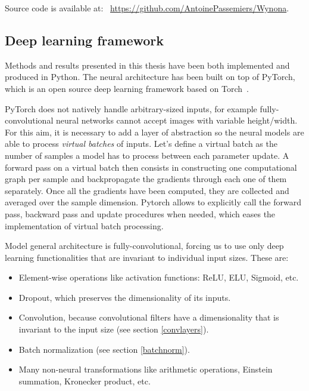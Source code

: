     Source code is available at: \,
    \href{https://github.com/AntoinePassemiers/Wynona}{https://github.com/AntoinePassemiers/Wynona}.

  \subsection{Deep learning framework}

    Methods and results presented in this thesis have been both implemented and produced in
    Python. The neural architecture has been built on top of PyTorch,
    which is an open source deep learning framework based on Torch~\cite{torch}.

    PyTorch does not natively handle arbitrary-sized inputs, for example fully-convolutional
    neural networks cannot accept images with variable height/width.
    For this aim, it is necessary to add a layer of abstraction so the neural models are
    able to process \textit{virtual batches} of inputs. Let's define a virtual batch as the number
    of samples a model has to process between each parameter update.
    A forward pass on a virtual batch then consists in constructing one computational graph
    per sample and backpropagate the gradients through each one of them separately.
    Once all the gradients have been computed, they are collected and averaged over the sample
    dimension. Pytorch allows to explicitly call the forward pass, backward pass and update
    procedures when needed, which eases the implementation of virtual batch processing.

    Model general architecture is fully-convolutional, forcing us to use only deep learning
    functionalities that are invariant to individual input sizes. These are:

    \begin{itemize}
      \item Element-wise operations like activation functions: ReLU, ELU, Sigmoid, etc.
      \item Dropout, which preserves the dimensionality of its inputs.
      \item Convolution, because convolutional filters have a dimensionality that is
      invariant to the input size (see section \ref{convlayers}).
      \item Batch normalization (see section \ref{batchnorm}).
      \item Many non-neural transformations like arithmetic operations, Einstein
      summation, Kronecker product, etc.
    \end{itemize}

